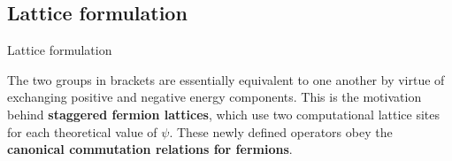 \documentclass[9pt, aspectratio=169]{beamer}
\begin{document}
\subsection{Lattice formulation}

\begin{frame}[allowframebreaks]{Lattice formulation}

	The two groups in brackets are essentially equivalent to one another by virtue of exchanging positive and negative energy components. This is the motivation behind \textbf{staggered fermion lattices}, which use two computational lattice sites for each theoretical value of $\psi$. These newly defined operators obey the \textbf{canonical commutation relations for fermions}.

	\vspace{1em}


\end{frame}
\end{document}

